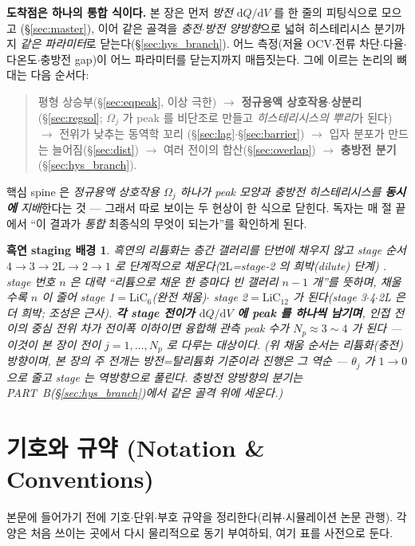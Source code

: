 \documentclass[11pt,a4paper]{article}
\newtheorem*{stagebox}{흑연 staging 배경}
\newcommand{\dd}{\mathrm{d}}
\begin{document}
\textbf{도착점은 하나의 통합 식이다.} 본 장은 먼저 \emph{방전} $\dd Q/\dd V$ 를 한 줄의 피팅식으로 모으고
(\S\ref{sec:master}), 이어 같은 골격을 \emph{충전$\cdot$방전 양방향}으로 넓혀 히스테리시스 분기까지 \emph{같은
파라미터}로 닫는다(\S\ref{sec:hys_branch}). 어느 측정(저율 OCV$\cdot$전류 차단$\cdot$다율$\cdot$다온도$\cdot$충방전
gap)이 어느 파라미터를 닫는지까지 매듭짓는다. 그에 이르는 논리의 뼈대는 다음 순서다:
\begin{quote}
평형 상승부(\S\ref{sec:eqpeak}, 이상 극한) $\to$ \textbf{정규용액 상호작용$\cdot$상분리}(\S\ref{sec:regsol};
$\Omega_j$ 가 peak 를 비단조로 만들고 \emph{히스테리시스의 뿌리}가 된다) $\to$ 전위가 낮추는 동역학 꼬리
(\S\ref{sec:lag}$\cdot$\S\ref{sec:barrier}) $\to$ 입자 분포가 만드는 늘어짐(\S\ref{sec:dist}) $\to$ 여러 전이의
합산(\S\ref{sec:overlap}) $\to$ \textbf{충방전 분기}(\S\ref{sec:hys_branch}).
\end{quote}
핵심 spine 은 \emph{정규용액 상호작용 $\Omega_j$ 하나가 peak 모양과 충방전 히스테리시스를 \textbf{동시에} 지배}한다는
것 — 그래서 따로 보이는 두 현상이 한 식으로 닫힌다. 독자는 매 절 끝에서 ``이 결과가 \emph{통합} 최종식의 무엇이
되는가''를 확인하게 된다.

\begin{stagebox}
흑연의 리튬화는 층간 갤러리를 단번에 채우지 않고 \emph{stage} 순서 $4\to3\to2\mathrm L\to2\to1$ 로 단계적으로
채운다($2\mathrm L$=stage-2 의 희박(dilute) 단계) \cite{dahn1991,ohzuku1993}. stage 번호 $n$ 은 대략 ``리튬으로
채운 한 층마다 빈 갤러리 $n-1$ 개''를 뜻하며, 채울수록 $n$ 이 줄어 stage 1$=\mathrm{LiC_6}$(완전 채움)$\cdot$
stage 2$=\mathrm{LiC_{12}}$ 가 된다(stage 3$\cdot$4$\cdot$2L 은 더 희박; 조성은 근사). \textbf{각 stage 전이가
$\dd Q/\dd V$ 에 peak 를 하나씩 남기며}, 인접 전이의 중심 전위 차가 전이폭 이하이면 융합해 관측 peak 수가
$N_p\approx3\sim4$ 가 된다 — 이것이 본 장이 전이 $j=1,\dots,N_p$ 로 다루는 대상이다. (위 채움 순서는 \emph{리튬화(충전)}
방향이며, 본 장의 주 전개는 \emph{방전}=탈리튬화 기준이라 진행은 그 역순 — $\theta_j$ 가 $1\to0$ 으로 줄고 stage 는
역방향으로 풀린다. \emph{충방전 양방향}의 분기는 PART~B(\S\ref{sec:hys_branch})에서 같은 골격 위에 세운다.)
\end{stagebox}

\tableofcontents
\newpage

\section{기호와 규약 (Notation \& Conventions)}\label{sec:notation}
본문에 들어가기 전에 기호$\cdot$단위$\cdot$부호 규약을 정리한다(리뷰$\cdot$시뮬레이션 논문 관행). 각 양은 처음
쓰이는 곳에서 다시 물리적으로 동기 부여하되, 여기 표를 사전으로 둔다.
\end{document}
